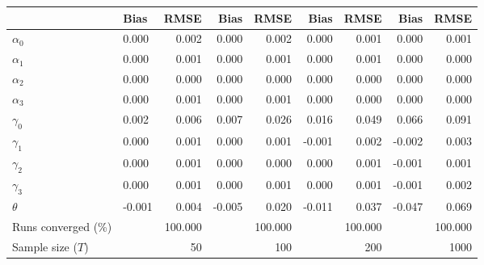 
\begin{tabular}[t]{llrrrrrrr}
\toprule
  & Bias & RMSE & Bias & RMSE & Bias & RMSE & Bias & RMSE\\
\midrule
$\alpha_{0}$ & 0.000 & 0.002 & 0.000 & 0.002 & 0.000 & 0.001 & 0.000 & 0.001\\
$\alpha_{1}$ & 0.000 & 0.001 & 0.000 & 0.001 & 0.000 & 0.001 & 0.000 & 0.000\\
$\alpha_{2}$ & 0.000 & 0.000 & 0.000 & 0.000 & 0.000 & 0.000 & 0.000 & 0.000\\
$\alpha_{3}$ & 0.000 & 0.001 & 0.000 & 0.001 & 0.000 & 0.000 & 0.000 & 0.000\\
$\gamma_{0}$ & 0.002 & 0.006 & 0.007 & 0.026 & 0.016 & 0.049 & 0.066 & 0.091\\
$\gamma_{1}$ & 0.000 & 0.001 & 0.000 & 0.001 & -0.001 & 0.002 & -0.002 & 0.003\\
$\gamma_{2}$ & 0.000 & 0.001 & 0.000 & 0.000 & 0.000 & 0.001 & -0.001 & 0.001\\
$\gamma_{3}$ & 0.000 & 0.001 & 0.000 & 0.001 & 0.000 & 0.001 & -0.001 & 0.002\\
$\theta$ & -0.001 & 0.004 & -0.005 & 0.020 & -0.011 & 0.037 & -0.047 & 0.069\\
Runs converged (\%) &  & 100.000 &  & 100.000 &  & 100.000 &  & 100.000\\
Sample size ($T$) &  & 50 &  & 100 &  & 200 &  & 1000\\
\bottomrule
\end{tabular}

